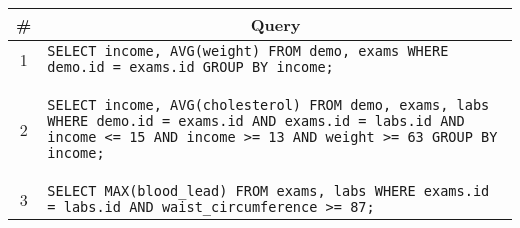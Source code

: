 \begin{tabular}{cl}
\toprule
\# & \multicolumn{1}{c}{Query} \\
\midrule
1 & \lstinline|SELECT income, AVG(weight) FROM demo, exams WHERE demo.id = exams.id GROUP BY income;| {queryno} \label{q1} \\
2 & 
\begin{minipage}{6in}
\begin{lstlisting}[breaklines]
SELECT income, AVG(cholesterol) FROM demo, exams, labs 
WHERE demo.id = exams.id AND exams.id = labs.id AND
income <= 15 AND income >= 13 AND weight >= 63 GROUP BY income;
\end{lstlisting}
\end{minipage}
{queryno} \label{q2} \\
3 & \lstinline|SELECT MAX(blood_lead) FROM exams, labs WHERE exams.id = labs.id AND waist_circumference >= 87;| {queryno} \label{q3}\\
\bottomrule
\end{tabular}
